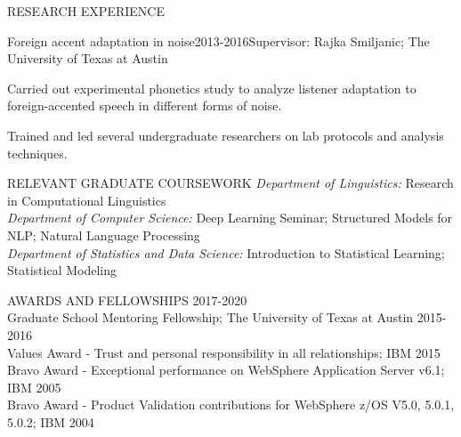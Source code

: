 \documentclass{resume} %
\begin{document}
\begin{rSection}{RESEARCH EXPERIENCE}
\begin{rSubsection}{Foreign accent adaptation in noise}{2013-2016}{Supervisor: Rajka Smiljanic; The University of Texas at Austin}{} 
\item Carried out experimental phonetics study to analyze listener adaptation to foreign-accented speech in different forms of noise.
\item Trained and led several undergraduate researchers on lab protocols and analysis techniques.
\end{rSubsection}

\end{rSection} 

\newpage
\begin{rSection}{RELEVANT GRADUATE COURSEWORK} \itemsep -3pt  
\vspace{-0.3em}
{\textit{Department of Linguistics:} Research in Computational Linguistics}\\ 
{\textit{Department of Computer Science:} Deep Learning Seminar; Structured Models for NLP; Natural Language Processing}\\
{\textit{Department of Statistics and Data Science:} Introduction to Statistical Learning; Statistical Modeling}
\end{rSection} 

\begin{rSection}{AWARDS AND FELLOWSHIPS} \itemsep -3pt  
\vspace{-0.3em}
{ \hfill2017-2020}\\ 
{Graduate School Mentoring Fellowship; The University of Texas at Austin \hfill2015-2016}\\
{Values Award - Trust and personal responsibility in all relationships; IBM \hfill2015} \\
{Bravo Award - Exceptional performance on WebSphere Application Server v6.1; IBM \hfill2005} \\
{Bravo Award - Product Validation contributions for WebSphere z/OS V5.0, 5.0.1, 5.0.2; IBM \hfill2004}
\end{rSection} 
\end{document}
